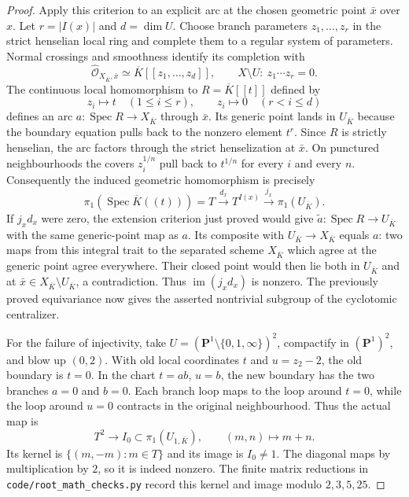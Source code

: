 \documentclass[11pt,a4paper]{article}
\begin{document}
\begin{proof}
Apply this criterion to an explicit arc at the chosen geometric point
$\bar x$ over $x$. Let $r=|I(x)|$ and $d=\dim U$. Choose branch
parameters $z_1,\ldots,z_r$ in the strict henselian local ring and
complete them to a regular system of parameters. Normal crossings and
smoothness identify its completion with
\[
 \widehat{\mathcal O}_{X_{\overline K},\bar x}
   \simeq\overline K[[z_1,\ldots,z_d]],
 \qquad X\setminus U:\ z_1\cdots z_r=0.
\]
The continuous local homomorphism to $R=\overline K[[t]]$ defined by
\[
 z_i\longmapsto t\quad(1\le i\le r),\qquad
 z_i\longmapsto0\quad(r<i\le d)
\]
defines an arc $a:\operatorname{Spec}R\to X_{\overline K}$ through
$\bar x$. Its generic point lands in $U_{\overline K}$ because the
boundary equation pulls back to the nonzero element $t^r$.
Since $R$ is strictly henselian, the arc factors through the strict
henselization at $\bar x$. On punctured neighbourhoods the covers
$z_i^{1/n}$ pull back to $t^{1/n}$ for every $i$ and every $n$.
Consequently the induced geometric homomorphism is precisely
\[
 \pi_1(\operatorname{Spec}\overline K((t)))
   =T\xrightarrow{d_x}T^{I(x)}\xrightarrow{j_x}\pi_1(U_{\overline K}).
\]
If $j_xd_x$ were zero, the extension criterion just proved would give
$\widetilde a:\operatorname{Spec}R\to U_{\overline K}$ with the same
generic-point map as $a$. Its composite with $U_{\overline K}\to
X_{\overline K}$ equals $a$: two maps from this integral trait to the
separated scheme $X_{\overline K}$ which agree at the generic point
agree everywhere. Their closed point would then lie both in
$U_{\overline K}$ and at $\bar x\in X_{\overline K}\setminus
U_{\overline K}$, a contradiction. Thus $\operatorname{im}(j_xd_x)$
is nonzero. The previously proved equivariance now gives the asserted
nontrivial subgroup of the cyclotomic centralizer.

For the failure of injectivity, take
$U=(\mathbf P^1\setminus\{0,1,\infty\})^2$, compactify in
$(\mathbf P^1)^2$, and blow up $(0,2)$. With old local coordinates
$t$ and $u=z_2-2$, the old boundary is $t=0$. In the chart
$t=ab$, $u=b$, the new boundary has the two branches $a=0$ and $b=0$.
Each branch loop maps to the loop around $t=0$, while the loop around
$u=0$ contracts in the original neighbourhood. Thus the actual map is
\[
 T^2\longrightarrow I_0\subset\pi_1(U_{1,\overline K}),
 \qquad(m,n)\longmapsto m+n.
\]
Its kernel is $\{(m,-m):m\in T\}$ and its image is $I_0\ne1$.
The diagonal maps by multiplication by $2$, so it is indeed nonzero.
The finite matrix reductions in \texttt{code/root\_math\_checks.py}
record this kernel and image modulo $2,3,5,25$.
\end{proof}
\end{document}
